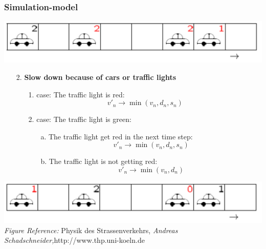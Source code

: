 \documentclass[9pt]{beamer}
\begin{document}
\begin{frame}
\frametitle{Simulation-model}
\includegraphics[width=0.7\columnwidth]{config_2.png}
\begin{itemize}
\item[2.]\textbf{Slow down because of cars or traffic lights}
\begin{itemize}
\item[1.]case: The traffic light is red:
\begin{equation}
v'_n \rightarrow \min(v_n,d_n,s_n)
\end{equation}
\item[2.]case: The traffic light is green:
\begin{itemize}
\item[a.] The traffic light get red in the next time step:
\begin{equation}
v'_n \rightarrow \min(v_n,d_n,s_n)
\label{min_lights}
\end{equation}
\item[b.] The traffic light is not getting red:
\begin{equation}
v'_n \rightarrow \min(v_n,d_n)
\end{equation}
\end{itemize}

\end{itemize}
\end{itemize}
\includegraphics[width=0.7\columnwidth]{config_3.png}\\
\textit{Figure Reference:} Physik des Strassenverkehrs, \emph{Andreas Schadschneider,}http://www.thp.uni-koeln.de
\end{frame}
\end{document}
